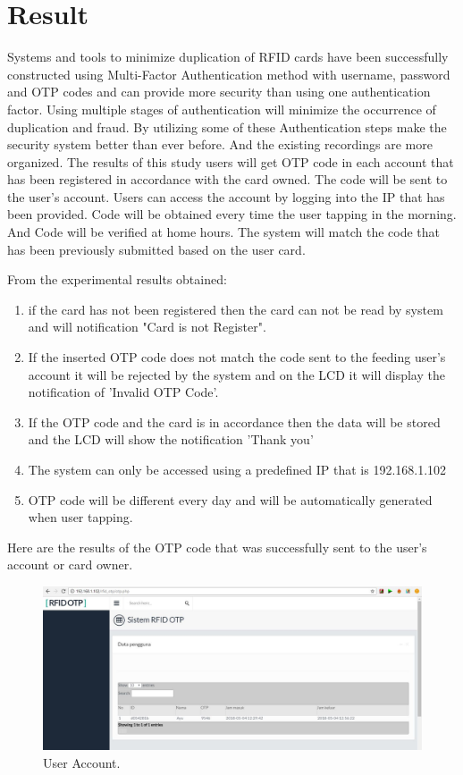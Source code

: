 \section{Result}
\label{Result}
Systems and tools to minimize duplication of RFID cards have been successfully constructed using Multi-Factor Authentication method with username, password and OTP codes and can provide more security than using one authentication factor. Using multiple stages of authentication will minimize the occurrence of duplication and fraud. By utilizing some of these Authentication steps make the security system better than ever before. And the existing recordings are more organized.
The results of this study users will get OTP code in each account that has been registered in accordance with the card owned. The code will be sent to the user's account. Users can access the account by logging into the IP that has been provided. Code will be obtained every time the user tapping in the morning. And Code will be verified at home hours. The system will match the code that has been previously submitted based on the user card.

From the experimental results obtained:
\begin{enumerate}
    \item 
    if the card has not been registered then the card can not be read by system and will notification "Card is not Register".
    \item
    If the inserted OTP code does not match the code sent to the feeding user's account it will be rejected by the system and on the LCD it will display the notification of 'Invalid OTP Code'.
    \item
    If the OTP code and the card is in accordance then the data will be stored and the LCD will show the notification 'Thank you'
    \item
    The system can only be accessed using a predefined IP that is 192.168.1.102
    \item
    OTP code will be different every day and will be automatically generated when user tapping.
\end{enumerate}

Here are the results of the OTP code that was successfully sent to the user's account or card owner.
\begin{figure}[ht]
\begin{center}
\includegraphics[width=12cm]{figures/OTP1.JPG}
\end{center}
\caption{User Account.
\label{eq:30}}
\end{figure}  

